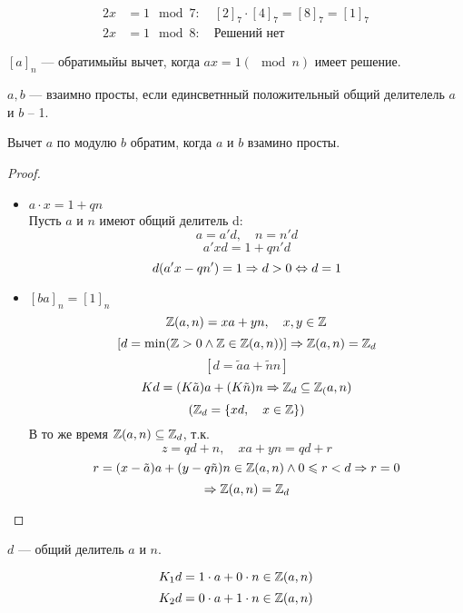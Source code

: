 \begin{example}~
  \begin{align*}
  2x &= 1 \mod 7 : \quad [2]_7 \cdot [4]_7 = [8]_7 = [1]_7 \\
  2x &= 1 \mod 8 : \quad \text{Решений нет}
  \end{align*}
\end{example}

\begin{definition}
  $[a]_n$ --- обратимыйы вычет, когда $ax = 1 (\mod n)$ имеет решение.
\end{definition}

\begin{reminder}
  $a, b$ --- взаимно просты, если единсветнный положительный общий делителель $a$ и $b$ -- 1.
\end{reminder}

\begin{theorem}
  Вычет $a$ по модулю $b$ обратим, когда $a$ и $b$ взамино просты.
\end{theorem}

\begin{proof}~
  \begin{itemize}
    \item[\text{$\Ra$}] $a \cdot x = 1 + qn$ \\
    Пусть $a$ и $n$ имеют общий делитель d:
    \[a = a'd, \quad n = n'd\] 
    \[a'x d = 1 + qn'd\]
    \[d(a'x - qn') = 1 \Rightarrow d > 0 \Leftrightarrow d = 1\]
    \item[\text{$\La$}] $[ba]_n = [1]_n$ \\
    \[\mathbb{Z}(a, n) = xa + yn, \quad x,y \in \mathbb{Z}\]
    \[[d = \min (\mathbb{Z} > 0 \land \mathbb{Z} \in \mathbb{Z}(a, n))] \Rightarrow \mathbb{Z}(a, n) = \mathbb{Z}_d\]
    \[[d = \tilde a a + \tilde n n]\]
    \[Kd = (K \tilde a) a + (K \tilde n) n \Rightarrow \mathbb{Z}_d \subseteq \mathbb{Z}_(a, n)\]
    \[(\mathbb{Z}_d = \{xd, \quad x \in \mathbb{Z}\})\]
    В то же время $\mathbb{Z}(a, n) \subseteq \mathbb{Z}_d$, т.к.
    \[z = qd + n, \quad xa + yn = qd + r\]
    \[r = (x - \tilde a)a + (y - q \tilde n)n \in \mathbb{Z}(a, n) \land 0 \leqslant r < d \Rightarrow r = 0\]
    \[\Rightarrow \mathbb{Z}(a, n) = \mathbb{Z}_d\]
  \end{itemize}
\end{proof}

\begin{corollary}
  $d$ --- общий делитель $a$ и $n$.
\end{corollary}

\begin{example}
  \[K_1 d = 1 \cdot a + 0 \cdot n \in \mathbb{Z}(a, n)\]
  \[K_2 d = 0 \cdot a + 1 \cdot n \in \mathbb{Z}(a, n)\]
\end{example}

